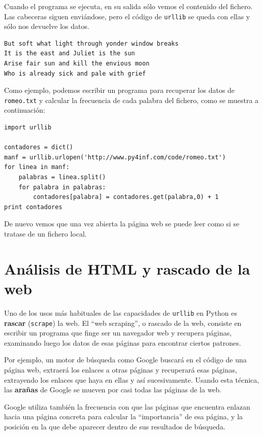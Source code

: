 Cuando el programa se ejecuta, en su salida
sólo vemos el contenido del fichero. Las cabeceras
siguen enviándose, pero el código de {\tt urllib}
se queda con ellas y sólo nos devuelve
los datos.

\beforeverb
\begin{verbatim}
But soft what light through yonder window breaks
It is the east and Juliet is the sun
Arise fair sun and kill the envious moon
Who is already sick and pale with grief
\end{verbatim}
\afterverb
%

Como ejemplo, podemos escribir un
programa para recuperar los datos de
{\tt romeo.txt} y calcular la frecuencia
de cada palabra del fichero, como se muestra a continuación:

\beforeverb
\begin{verbatim}
import urllib

contadores = dict()
manf = urllib.urlopen('http://www.py4inf.com/code/romeo.txt')
for linea in manf:
    palabras = linea.split()
    for palabra in palabras:
        contadores[palabra] = contadores.get(palabra,0) + 1   
print contadores
\end{verbatim}
\afterverb
%
De nuevo vemos que una vez abierta la página web
se puede leer como si se tratase de un fichero local.

\section{Análisis de HTML y rascado de la web}

Uno de los usos más habituales de las capacidades de {\tt urllib} en Python
es {\bf rascar} ({\tt scrape}) la web. El ``web scraping'', o rascado de la web,
consiste en escribir un programa
que finge ser un navegador web y recupera páginas, examinando
luego los datos de esas páginas para encontrar ciertos patrones.

Por ejemplo, un motor de búsqueda como Google buscará en el código
de una página web, extraerá los enlaces a otras páginas y recuperará
esas páginas, extrayendo los enlaces que haya en ellas y así sucesivamente. Usando esta técnica,
las  {\bf arañas} de Google se mueven por casi todas las páginas de
la web.

Google utiliza también la frecuencia con que las páginas que encuentra enlazan
hacia una página concreta para calcular la ``importancia'' de
esa página, y la posición en la que debe aparecer dentro de sus resultados de búsqueda.

